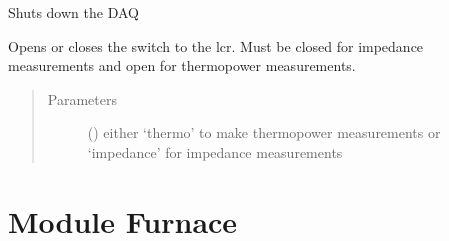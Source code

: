 \documentclass[letterpaper,10pt,english]{sphinxmanual}
\begin{document}
\begin{fulllineitems}

\begin{fulllineitems}
\label{\detokenize{source/laboratory.drivers:laboratory.drivers.daq.DAQ.shutdown}}
Shuts down the DAQ

\end{fulllineitems}


\begin{fulllineitems}
\label{\detokenize{source/laboratory.drivers:laboratory.drivers.daq.DAQ.toggle_switch}}
Opens or closes the switch to the lcr. Must be closed for impedance measurements and open for thermopower measurements.
\begin{quote}\begin{description}
\item[{Parameters}] \leavevmode
{} () \textendash{} either ‘thermo’ to make thermopower measurements or ‘impedance’ for impedance measurements

\end{description}\end{quote}

\end{fulllineitems}


\end{fulllineitems}



\section{Module Furnace}
\label{\detokenize{source/laboratory.drivers:module-laboratory.drivers.furnace}}\label{\detokenize{source/laboratory.drivers:module-furnace}}
\end{document}

